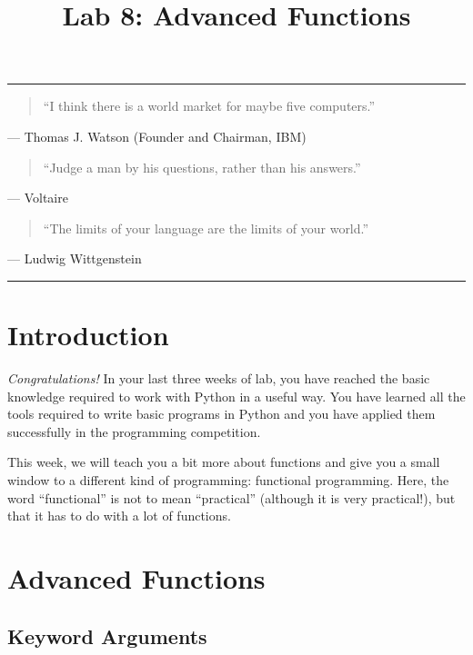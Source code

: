 \documentclass[11pt]{cselabheader}
\title{Lab 8: Advanced Functions}
\begin{document}
\maketitle

\hrule
\begin{quotation}
``I think there is a world market for maybe five computers.''
\end{quotation}
\begin{flushright}
--- Thomas J. Watson (Founder and Chairman, IBM)
\end{flushright}

\begin{quotation}
``Judge a man by his questions, rather than his answers.''
\end{quotation}
\begin{flushright}
--- Voltaire
\end{flushright}

\begin{quotation}
``The limits of your language are the limits of your world.''
\end{quotation}
\begin{flushright}
--- Ludwig Wittgenstein
\end{flushright}

\hrule

\section{Introduction}
\emph{Congratulations!} In your last three weeks of lab, you have reached the
basic knowledge required to work with Python in a useful way. You have learned
all the tools required to write basic programs in Python and you have applied
them successfully in the programming competition.

This week, we will teach you a bit more about functions and give you a small
window to a different kind of programming: functional programming. Here, the
word ``functional'' is not to mean ``practical'' (although it is very
practical!), but that it has to do with a lot of functions.

\pagebreak
\section{Advanced Functions}
\label{sec:advfun}

\subsection{Keyword Arguments}
\label{subsec:adv.args}
\end{document}
